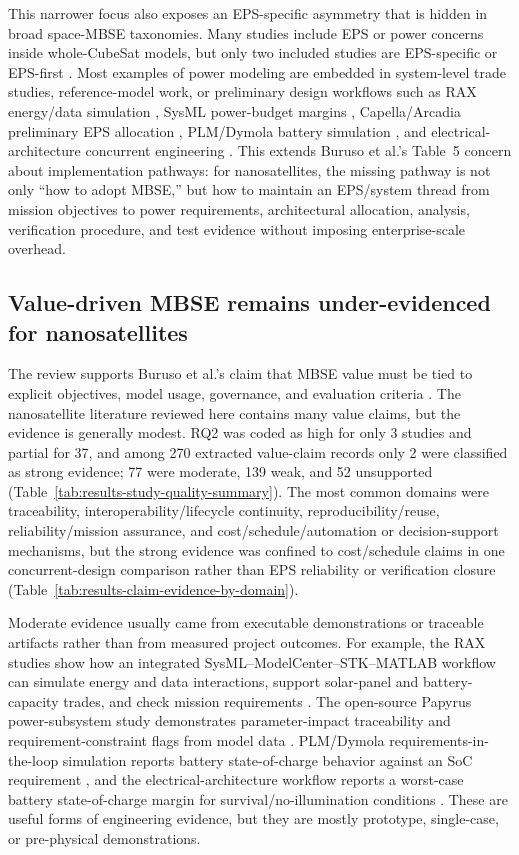 This narrower focus also exposes an EPS-specific asymmetry that is hidden in broad space-MBSE taxonomies.  Many studies include EPS or power concerns inside whole-CubeSat models, but only two included studies are EPS-specific or EPS-first \cite{paper-0026,paper-0059}.  Most examples of power modeling are embedded in system-level trade studies, reference-model work, or preliminary design workflows such as RAX energy/data simulation \cite{paper-0001,paper-0003}, SysML power-budget margins \cite{paper-0080}, Capella/Arcadia preliminary EPS allocation \cite{paper-0078}, PLM/Dymola battery simulation \cite{paper-0059}, and electrical-architecture concurrent engineering \cite{paper-0053}.  This extends Buruso et al.'s Table~5 concern about implementation pathways: for nanosatellites, the missing pathway is not only ``how to adopt MBSE,'' but how to maintain an EPS/system thread from mission objectives to power requirements, architectural allocation, analysis, verification procedure, and test evidence without imposing enterprise-scale overhead.

\subsection{Value-driven MBSE remains under-evidenced for nanosatellites}
\label{sec:discussion-value-evidence}

The review supports Buruso et al.'s claim that MBSE value must be tied to explicit objectives, model usage, governance, and evaluation criteria \cite{Buruso2026MBSESpace}.  The nanosatellite literature reviewed here contains many value claims, but the evidence is generally modest.  RQ2 was coded as high for only 3 studies and partial for 37, and among 270 extracted value-claim records only 2 were classified as strong evidence; 77 were moderate, 139 weak, and 52 unsupported (Table~\ref{tab:results-study-quality-summary}).  The most common domains were traceability, interoperability/lifecycle continuity, reproducibility/reuse, reliability/mission assurance, and cost/schedule/automation or decision-support mechanisms, but the strong evidence was confined to cost/schedule claims in one concurrent-design comparison rather than EPS reliability or verification closure (Table~\ref{tab:results-claim-evidence-by-domain}).

Moderate evidence usually came from executable demonstrations or traceable artifacts rather than from measured project outcomes.  For example, the RAX studies show how an integrated SysML--ModelCenter--STK--MATLAB workflow can simulate energy and data interactions, support solar-panel and battery-capacity trades, and check mission requirements \cite{paper-0001,paper-0003}.  The open-source Papyrus power-subsystem study demonstrates parameter-impact traceability and requirement-constraint flags from model data \cite{paper-0026}.  PLM/Dymola requirements-in-the-loop simulation reports battery state-of-charge behavior against an SoC requirement \cite{paper-0059}, and the electrical-architecture workflow reports a worst-case battery state-of-charge margin for survival/no-illumination conditions \cite{paper-0053}.  These are useful forms of engineering evidence, but they are mostly prototype, single-case, or pre-physical demonstrations.

